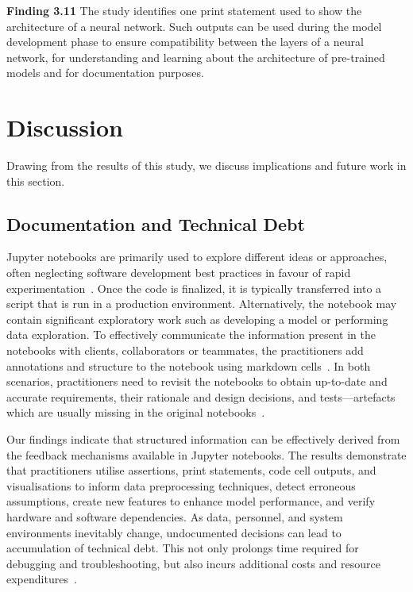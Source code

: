\documentclass[smallextended]{svjour3}       %
\newcommand{\highlight}[1]{\begin{framed}%
  \noindent#1
\end{framed}}
\begin{document}
\highlight{\textbf{Finding 3.11} The study identifies one print statement used to show the architecture of a neural network. Such outputs can be used during the model development phase to ensure compatibility between the layers of a neural network, for understanding and learning about the architecture of pre-trained models and for documentation purposes.}

\section{Discussion}\label{sec:discuss}

Drawing from the results of this study, we discuss implications and future work in this section.

\subsection{Documentation and Technical Debt}

Jupyter notebooks are primarily used to explore different ideas or approaches, often neglecting software development best practices in favour of rapid experimentation~\citep{kery2018story,rule2018exploration,pimentel2019large-scale}. Once the code is finalized, it is typically transferred into a script that is run in a production environment. Alternatively, the notebook may contain significant exploratory work such as developing a model or performing data exploration. To effectively communicate the information present in the notebooks with clients, collaborators or teammates, the practitioners add annotations and structure to the notebook using markdown cells~\citep{kery2018story,rule2018exploration}. In both scenarios, practitioners need to revisit the notebooks to obtain up-to-date and accurate requirements, their rationale and design decisions, and tests---artefacts which are usually missing in the original notebooks~\citep{pimentel2019large-scale,psallidas2019data,grotov2022large-scale}.

Our findings indicate that structured information can be effectively derived from the feedback mechanisms available in Jupyter notebooks. The results demonstrate that practitioners utilise assertions, print statements, code cell outputs, and visualisations to inform data preprocessing techniques, detect erroneous assumptions, create new features to enhance model performance, and verify hardware and software dependencies. As data, personnel, and system environments inevitably change, undocumented decisions can lead to accumulation of technical debt. This not only prolongs time required for debugging and troubleshooting, but also incurs additional costs and resource expenditures~\citep{sculley2015hidden,amershi2019software,sambasivan2021everyone}.
\end{document}
